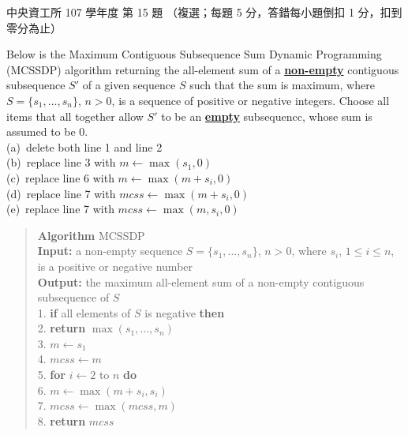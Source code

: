 \begin{pastexam}[label={px:ncu-107-dsa-15}]{中央資工所 107 學年度 第 15 題}
（複選；每題 5 分，答錯每小題倒扣 1 分，扣到零分為止）

Below is the Maximum Contiguous Subsequence Sum Dynamic Programming (MCSSDP) algorithm returning
the all-element sum of a \underline{\textbf{non-empty}} contiguous subsequence $S'$ of a given
sequence $S$ such that the sum is maximum, where $S=\{s_1,\ldots,s_n\}$, $n>0$, is a sequence of
positive or negative integers. Choose all items that all together allow $S'$ to be an
\underline{\textbf{empty}} subsequencc, whose sum is assumed to be 0.\\
(a)~delete both line 1 and line 2\\
(b)~replace line 3 with $m\leftarrow\max(s_1,0)$\\
(c)~replace line 6 with $m\leftarrow\max(m+s_i,0)$\\
(d)~replace line 7 with $mcss\leftarrow\max(m+s_i,0)$\\
(e)~replace line 7 with $mcss\leftarrow\max(m,s_i,0)$
\begin{quote}
\textbf{Algorithm} MCSSDP\\
\textbf{Input:} a non-empty sequence $S=\{s_1,\ldots,s_n\}$, $n>0$, where $s_i$, $1\le i\le n$, is
a positive or negative number\\
\textbf{Output:} the maximum all-element sum of a non-empty contiguous subsequence of $S$\\
1. \textbf{if} all elements of $S$ is negative \textbf{then}\\
2. \qquad \textbf{return} $\max(s_1,\ldots,s_n)$\\
3. $m\leftarrow s_1$\\
4. $mcss\leftarrow m$\\
5. \textbf{for} $i\leftarrow 2$ to $n$ \textbf{do}\\
6. \quad $m\leftarrow\max(m+s_i,s_i)$\\
7. \quad $mcss\leftarrow\max(mcss,m)$\\
8. \textbf{return} $mcss$
\end{quote}
\end{pastexam}

